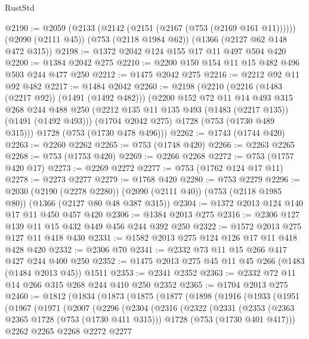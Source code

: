 \begin{lexlean}{RustStd}
\begin{coremodule}
@2190 := @2059
    (@2133 (@2142 (@2151 (@2167 (@753 (@2169 @161 @11))))))
    (@2090 (@2111 @45))
    (@753 (@2118 @1984 @62))
    (@1366 (@2127 @62 @148 @472 @315))
@2198 := @1372 @2042 @124 @155 @17 @11 @497 @504 @420
@2200 := @1384 @2042 @275
@2210 := @2200 @150 @154 @11 @15 @482 @496 @503 @244 @477 @250
@2212 := @1475 @2042 @275
@2216 := @2212 @92 @11 @92 @482
@2217 := @1484 @2042
@2260 := @2198
    (@2210
      (@2216 (@1483 (@2217 @92)) (@1491 (@1492 @482)))
      (@2200
        @152
        @72
        @11
        @14
        @493
        @315
        @268
        @244
        @488
        @250
        (@2212 @135 @11 @135 @493 (@1483 (@2217 @135)) (@1491 (@1492 @493)))
        (@1704 @2042 @275)
        @1728
        (@753 (@1730 @489 @315)))
      @1728
      (@753 (@1730 @478 @496)))
@2262 := @1743 (@1744 @420)
@2263 := @2260 @2262
@2265 := @753 (@1748 @420)
@2266 := @2263 @2265
@2268 := @753 (@1753 @420)
@2269 := @2266 @2268
@2272 := @753 (@1757 @420 @17)
@2273 := @2269 @2272
@2277 := @753 (@1762 @124 @17 @11)
@2278 := @2273 @2277
@2279 := @1768 @420
@2280 := @753 @2279
@2296 := @2030
    (@2190 (@2278 @2280))
    (@2090 (@2111 @40))
    (@753 (@2118 @1985 @80))
    (@1366 (@2127 @80 @48 @387 @315))
@2304 := @1372 @2013 @124 @140 @17 @11 @450 @457 @420
@2306 := @1384 @2013 @275
@2316 := @2306 @127 @139 @11 @15 @432 @449 @456 @244 @392 @250
@2322 := @1572 @2013 @275 @127 @11 @418 @430
@2331 := @1582 @2013 @275 @124 @126 @17 @11 @418 @428 @420
@2332 := @2306 @70
@2341 := @2332 @73 @11 @15 @266 @417 @427 @244 @400 @250
@2352 := @1475 @2013 @275 @45 @11 @45 @266 (@1483 (@1484 @2013 @45)) @1511
@2353 := @2341 @2352
@2363 := @2332 @72 @11 @14 @266 @315 @268 @244 @410 @250 @2352
@2365 := @1704 @2013 @275
@2460 := @1812
    (@1834
      (@1873
        (@1875
          (@1877
            (@1898
              (@1916
                (@1933
                  (@1951
                    (@1967
                      (@1971
                        (@2007
                          (@2296
                            (@2304
                              (@2316
                                (@2322
                                  (@2331
                                    (@2353
                                      (@2363 @2365 @1728 (@753 (@1730 @411 @315)))
                                      @1728
                                      (@753 (@1730 @401 @417)))
                                    @2262
                                    @2265
                                    @2268
                                    @2272
                                    @2277

\end{coremodule}
\end{lexlean}
